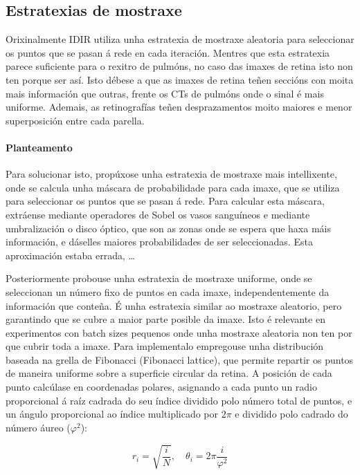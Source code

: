 \subsection{Estratexias de mostraxe}
\label{subsec:Estratexias de mostraxe}

Orixinalmente IDIR utiliza unha estratexia de mostraxe aleatoria para seleccionar os puntos que se pasan á rede en cada iteración.
Mentres que esta estratexia parece suficiente para o rexitro de pulmóns, no caso das imaxes de retina isto non ten porque ser así.
Isto débese a que as imaxes de retina teñen seccións con moita mais información que outras, frente os CTs de pulmóns onde o sinal é mais uniforme.
Ademais, as retinografías teñen desprazamentos moito maiores e menor superposición entre cada parella. 

\paragraph{Planteamento}
\label{par:Planteamento}

Para solucionar isto, propúxose unha estratexia de mostraxe mais intellixente, onde se calcula unha máscara de probabilidade para cada imaxe, que se utiliza para seleccionar os puntos que se pasan á rede.
Para calcular esta máscara, extráense mediante operadores de Sobel os vasos sanguíneos e mediante umbralización o disco óptico, que son as zonas onde se espera que haxa máis información, e dáselles maiores probabilidades de ser seleccionadas.
Esta aproximación estaba errada, \dots

Posteriormente probouse unha estratexia de mostraxe uniforme, onde se seleccionan un número fixo de puntos en cada imaxe, independentemente da información que conteña.
É unha estratexia similar ao mostraxe aleatorio, pero garantindo que se cubre a maior parte posible da imaxe. Isto é relevante en experimentos con batch sizes pequenos onde unha mostraxe aleatoria non ten por que cubrir toda a imaxe.
Para implementalo empregouse unha distribución baseada na grella de Fibonacci (Fibonacci lattice), que permite repartir os puntos de maneira uniforme sobre a superficie circular da retina. 
A posición de cada punto calcúlase en coordenadas polares, asignando a cada punto un radio proporcional á raíz cadrada do seu índice dividido polo número total de puntos, e un ángulo proporcional ao índice multiplicado por $2\pi$ e dividido polo cadrado do número áureo ($\varphi^2$):

\[
r_i = \sqrt{\frac{i}{N}}, \quad \theta_i = 2\pi \frac{i}{\varphi^2}
\]

